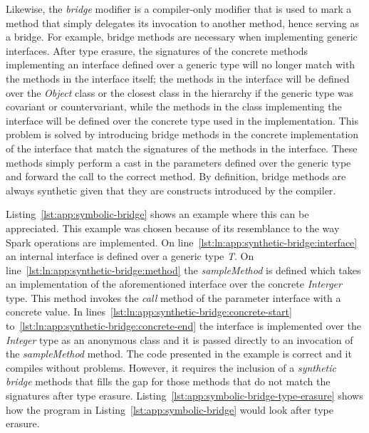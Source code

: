 Likewise, the \textit{bridge} modifier is a compiler-only modifier that is used to mark a method that simply delegates its invocation to another method, hence serving as a bridge. For example, bridge methods are necessary when implementing generic interfaces. After type erasure, the signatures of the concrete methods implementing an interface defined over a generic type will no longer match with the methods in the interface itself; the methods in the interface will be defined over the \textit{Object} class or the closest class in the hierarchy if the generic type was covariant or countervariant, while the methods in the class implementing the interface will be defined over the concrete type used in the implementation. This problem is solved by introducing bridge methods in the concrete implementation of the interface that match the signatures of the methods in the interface. These methods simply perform a cast in the parameters defined over the generic type and forward the call to the correct method. By definition, bridge methods are always synthetic given that they are constructs introduced by the compiler.

Listing~\ref{lst:app:symbolic-bridge} shows an example where this can be appreciated. This example was chosen because of its resemblance to the way Spark operations are implemented. On line~\ref{lst:ln:app:synthetic-bridge:interface} an internal interface is defined over a generic type \textit{T}. On line~\ref{lst:ln:app:synthetic-bridge:method} the \textit{sampleMethod} is defined which takes an implementation of the aforementioned interface over the concrete \textit{Interger} type. This method invokes the \textit{call} method of the parameter interface with a concrete value. In lines~\ref{lst:ln:app:synthetic-bridge:concrete-start} to~\ref{lst:ln:app:synthetic-bridge:concrete-end} the interface is implemented over the \textit{Integer} type as an anonymous class and it is passed directly to an invocation of the \textit{sampleMethod} method. The code presented in the example is correct and it compiles without problems. However, it requires the inclusion of a \textit{synthetic bridge} methods that fills the gap for those methods that do not match the signatures after type erasure. Listing~\ref{lst:app:symbolic-bridge-type-erasure} shows how the program in Listing~\ref{lst:app:symbolic-bridge} would look after type erasure. 

